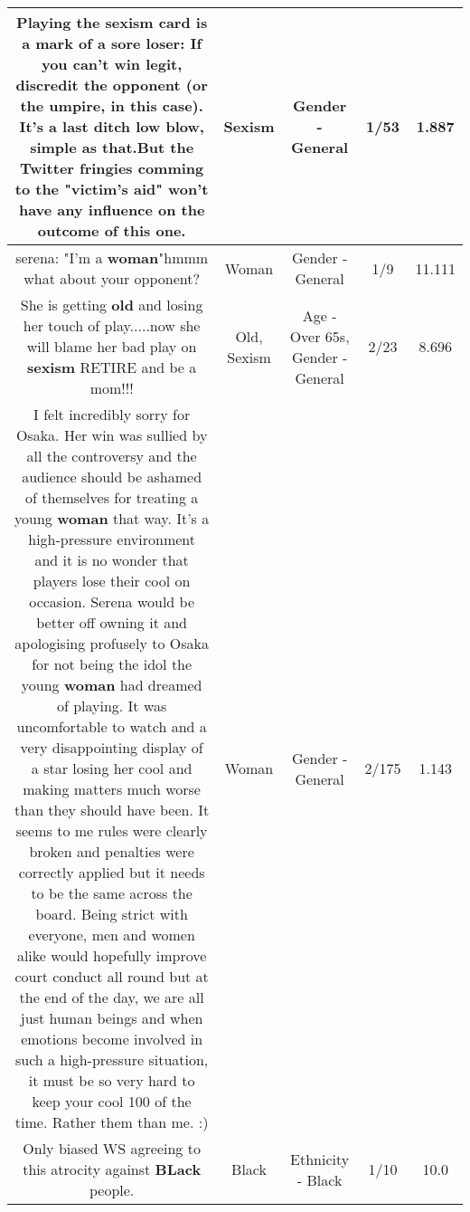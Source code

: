 \documentclass[11pt]{article}
\newlength\mylength
\begin{document}
\begin{center}
\begin{longtable}{|C{.65\mylength}|C{.30\mylength}|C{.12\mylength}|C{.12\mylength}|C{.12\mylength}|}
  \small Playing the \textbf{sexism} card is a mark of a sore loser: If you can't win legit, discredit the opponent (or the umpire, in this case). It's a last ditch low blow, simple as that.But the Twitter fringies comming to the "victim's aid" won't have any influence on the outcome of this one.\normalsize   & Sexism & Gender - General & 1/53 & 1.887 \\  \hline
  \small serena: "I'm a \textbf{woman}"hmmm what about your opponent?\normalsize   & Woman & Gender - General & 1/9 & 11.111 \\  \hline
  \small She is getting \textbf{old} and losing her touch of play.....now she will blame her bad play on \textbf{sexism}   RETIRE and be a mom!!!\normalsize   & Old, Sexism & Age - Over 65s, Gender - General & 2/23 & 8.696 \\  \hline
  \small I felt incredibly sorry for Osaka. Her win was sullied by all the controversy and the audience should be ashamed of themselves for treating a young \textbf{woman} that way. It's a high-pressure environment and it is no wonder that players lose their cool on occasion. Serena would be better off owning it and apologising profusely to Osaka for not being the idol the young \textbf{woman} had dreamed of playing. It was uncomfortable to watch and a very disappointing display of a star losing her cool and making matters much worse than they should have been. It seems to me rules were clearly broken and penalties were correctly applied but it needs to be the same across the board. Being strict with everyone, men and women alike would hopefully improve court conduct all round but at the end of the day, we are all just human beings and when emotions become involved in such a high-pressure situation, it must be so very hard to keep your cool 100 of the time. Rather them than me. :)\normalsize   & Woman & Gender - General & 2/175 & 1.143 \\  \hline
  \small Only biased WS agreeing to this atrocity against \textbf{BLack} people.\normalsize   & Black & Ethnicity - Black & 1/10 & 10.0 \\  \hline

\end{longtable}
\end{center}
\end{document}
